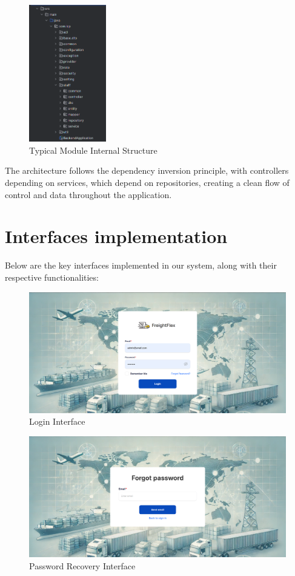 \begin{figure}[H]
  \centering
  \includegraphics[width=0.3\textwidth]{graphics/sys-design/backend_folder_structure_2.png}
  \caption{Typical Module Internal Structure}
  \label{fig:module_structure}
\end{figure}

The architecture follows the dependency inversion principle, with controllers depending on services, which depend on repositories, creating a clean flow of control and data throughout the application.

\section{Interfaces implementation}
Below are the key interfaces implemented in our system, along with their respective functionalities:
\begin{figure}[H]
    \centering
    \includegraphics[width=15cm]{graphics/UI/login.png}
    \caption{Login Interface}
    \label{fig:login}
\end{figure}

\begin{figure}[H]
    \centering
    \includegraphics[width=15cm]{graphics/UI/forgot.png}
    \caption{Password Recovery Interface}
    \label{fig:forgot}
\end{figure}

